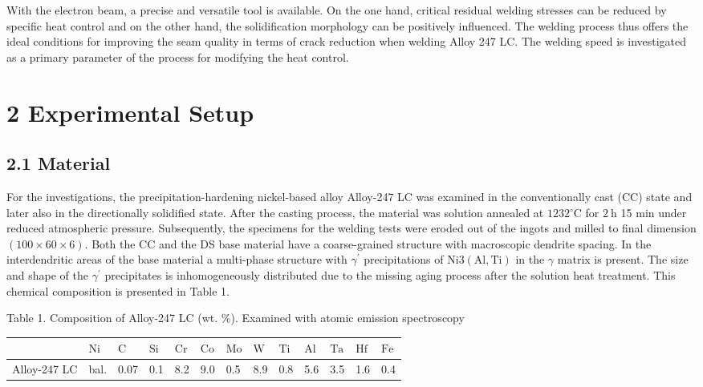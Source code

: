 \documentclass[10pt]{article}
\begin{document}
With the electron beam, a precise and versatile tool is available. On the one hand, critical residual welding stresses can be reduced by specific heat control and on the other hand, the solidification morphology can be positively influenced. The welding process thus offers the ideal conditions for improving the seam quality in terms of crack reduction when welding Alloy 247 LC. The welding speed is investigated as a primary parameter of the process for modifying the heat control.

\section*{2 Experimental Setup}
\subsection*{2.1 Material}
For the investigations, the precipitation-hardening nickel-based alloy Alloy-247 LC was examined in the conventionally cast (CC) state and later also in the directionally solidified state. After the casting process, the material was solution annealed at $1232{ }^{\circ} \mathrm{C}$ for $2 \mathrm{~h}$ 15 min under reduced atmospheric pressure. Subsequently, the specimens for the welding tests were eroded out of the ingots and milled to final dimension $(100 \times 60 \times 6)$. Both the $\mathrm{CC}$ and the DS base material have a coarse-grained structure with macroscopic dendrite spacing. In the interdendritic areas of the base material a multi-phase structure with $\gamma^{\prime}$ precipitations of $\mathrm{Ni} 3(\mathrm{Al}, \mathrm{Ti})$ in the $\gamma$ matrix is present. The size and shape of the $\gamma^{\prime}$ precipitates is inhomogeneously distributed due to the missing aging process after the solution heat treatment. This chemical composition is presented in Table 1.

Table 1. Composition of Alloy-247 LC (wt. \%). Examined with atomic emission spectroscopy

\begin{center}
\begin{tabular}{l|l|l|l|l|l|l|l|l|l|l|l|l}
\hline
 & $\mathrm{Ni}$ & $\mathrm{C}$ & $\mathrm{Si}$ & $\mathrm{Cr}$ & $\mathrm{Co}$ & $\mathrm{Mo}$ & $\mathrm{W}$ & $\mathrm{Ti}$ & $\mathrm{Al}$ & $\mathrm{Ta}$ & $\mathrm{Hf}$ & $\mathrm{Fe}$ \\
\hline
Alloy-247 LC & bal. & 0.07 & 0.1 & 8.2 & 9.0 & 0.5 & 8.9 & 0.8 & 5.6 & 3.5 & 1.6 & 0.4 \\
\hline
\end{tabular}
\end{center}
\end{document}
